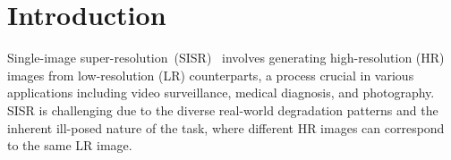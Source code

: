 \section{Introduction}
\label{sec:intro}

Single-image super-resolution~(SISR)~\cite{sun2010gradient,dong2014learning, bevilacqua2012low, yan2015single} involves generating high-resolution (HR) images from low-resolution (LR) counterparts, a process crucial in various applications including  video surveillance, medical diagnosis, and  photography. SISR is challenging due to the diverse real-world degradation patterns and the inherent ill-posed nature of the task, where different HR images can correspond to the same LR image.

